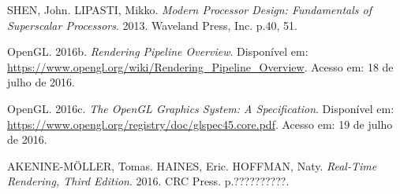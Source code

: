\documentclass[brazil,ruledheader]{abntifes}
\begin{document}
\begin{thebibliography}{9}
SHEN, John. LIPASTI, Mikko. \textit{Modern Processor Design: Fundamentals of Superscalar Processors}. 2013. Waveland Press, Inc. p.40, 51.

OpenGL. 2016b. \textit{Rendering Pipeline Overview}. Disponível em: \url{https://www.opengl.org/wiki/Rendering_Pipeline_Overview}.
Acesso em: 18 de julho de 2016.

OpenGL. 2016c. \textit{The OpenGL Graphics System:
A Specification}. Disponível em: \url{https://www.opengl.org/registry/doc/glspec45.core.pdf}.
Acesso em: 19 de julho de 2016.

AKENINE-MÖLLER, Tomas. HAINES, Eric. HOFFMAN, Naty. \textit{Real-Time Rendering, Third Edition}. 2016. CRC Press. p.??????????.


\end{thebibliography}


\anexo
\end{document}
